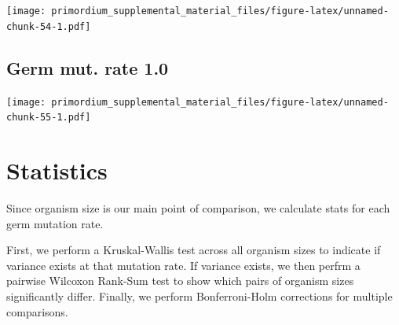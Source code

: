 \documentclass[]{book}
\begin{document}
\texttt{[image: primordium\_supplemental\_material\_files/figure-latex/unnamed-chunk-54-1.pdf]}

\hypertarget{germ-mut.-rate-1.0}{%
\subsection{Germ mut. rate 1.0}\label{germ-mut.-rate-1.0}}

\texttt{[image: primordium\_supplemental\_material\_files/figure-latex/unnamed-chunk-55-1.pdf]}

\hypertarget{statistics-2}{%
\section{Statistics}\label{statistics-2}}

Since organism size is our main point of comparison, we calculate stats for each germ mutation rate.

First, we perform a Kruskal-Wallis test across all organism sizes to indicate if variance exists at that mutation rate.
If variance exists, we then perfrm a pairwise Wilcoxon Rank-Sum test to show which pairs of organism sizes significantly differ.
Finally, we perform Bonferroni-Holm corrections for multiple comparisons.
\end{document}
